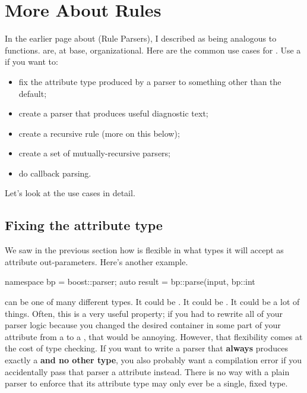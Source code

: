 \documentclass{MyBook}
\begin{document}
\section{More About Rules}

In the earlier page about  (Rule Parsers), I described  as being analogous to functions.  are, at base, organizational. Here are the common use cases for . Use a  if you want to:

\begin{itemize}
\item
  fix the attribute type produced by a parser to something other than the default;
\item
  create a parser that produces useful diagnostic text;
\item
  create a recursive rule (more on this below);
\item
  create a set of mutually-recursive parsers;
\item
  do callback parsing.
\end{itemize}

Let's look at the use cases in detail.

\subsection{Fixing the attribute type}

We saw in the previous section how  is flexible in what types it will accept as attribute out-parameters. Here's another example.

\begin{code}
namespace bp = boost::parser;
auto result = bp::parse(input, bp::int %
\end{code}

 can be one of many different types. It could be . It could be . It could be a lot of things. Often, this is a very useful property; if you had to rewrite all of your parser logic because you changed the desired container in some part of your attribute from a  to a , that would be annoying. However, that flexibility comes at the cost of type checking. If you want to write a parser that \textbf{always} produces exactly a  \textbf{and no other type}, you also probably want a compilation error if you accidentally pass that parser a  attribute instead. There is no way with a plain parser to enforce that its attribute type may only ever be a single, fixed type.
\end{document}
